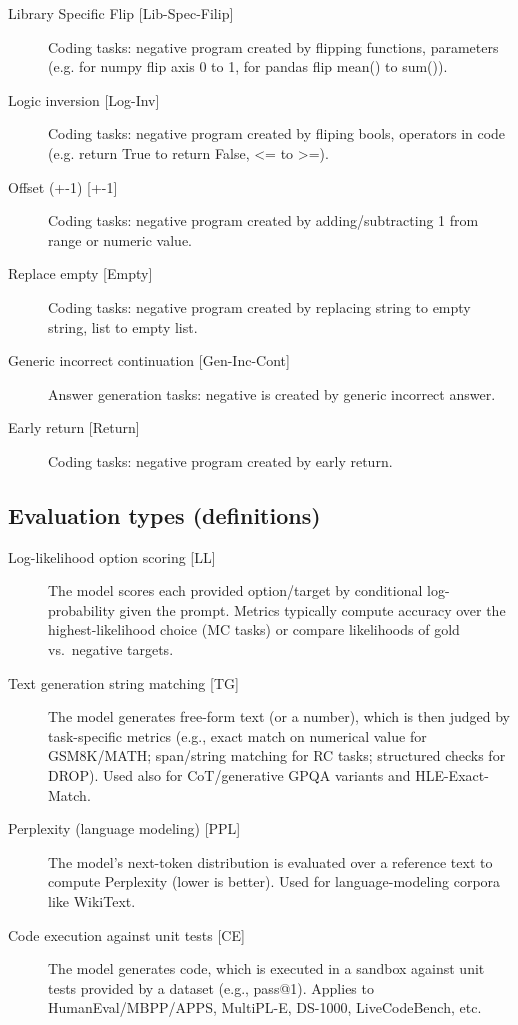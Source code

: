 \documentclass{article}
\begin{document}
\begin{description}
  \item [Library Specific Flip \textnormal{[Lib-Spec-Filip]}] Coding tasks: negative program created by flipping functions, parameters (e.g. for numpy flip axis 0 to 1, for pandas flip mean() to sum()).
  \item [Logic inversion \textnormal{[Log-Inv]}] Coding tasks: negative program created by fliping bools, operators in code (e.g. return True to return False, <= to >=).
  \item [Offset (+-1) \textnormal{[+-1]}] Coding tasks: negative program created by adding/subtracting 1 from range or numeric value.
  \item [Replace empty \textnormal{[Empty]}] Coding tasks: negative program created by replacing string to empty string, list to empty list.
  \item [Generic incorrect continuation \textnormal{[Gen-Inc-Cont]}] Answer generation tasks: negative is created by generic incorrect answer.
  \item [Early return \textnormal{[Return]}] Coding tasks: negative program created by early return.
\end{description}

\subsection*{Evaluation types (definitions)}
\begin{description}
  \item[Log-likelihood option scoring \textnormal{[LL]}] The model scores each provided option/target by conditional log-probability given the prompt. Metrics typically compute accuracy over the highest-likelihood choice (MC tasks) or compare likelihoods of gold vs.\ negative targets.
  \item[Text generation string matching \textnormal{[TG]}] The model generates free-form text (or a number), which is then judged by task-specific metrics (e.g., exact match on numerical value for GSM8K/MATH; span/string matching for RC tasks; structured checks for DROP). Used also for CoT/generative GPQA variants and HLE-Exact-Match.
  \item[Perplexity (language modeling) \textnormal{[PPL]}] The model’s next-token distribution is evaluated over a reference text to compute Perplexity (lower is better). Used for language-modeling corpora like WikiText.
  \item[Code execution against unit tests \textnormal{[CE]}] The model generates code, which is executed in a sandbox against unit tests provided by a dataset (e.g., pass@1). Applies to HumanEval/MBPP/APPS, MultiPL-E, DS-1000, LiveCodeBench, etc.
\end{description}
\end{document}
